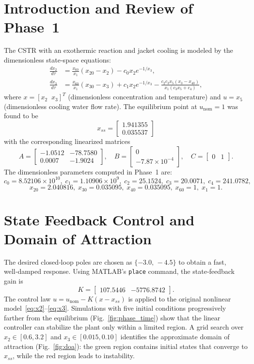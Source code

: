 \documentclass[12pt,a4paper]{article}
\begin{document}
\section{Introduction and Review of Phase~1}
The CSTR with an exothermic reaction and jacket cooling is modeled by the dimensionless state‑space equations:
\begin{align}
\frac{dx_2}{d\tau} &= \frac{x_{60}}{x_1}(x_{20}-x_2) - c_0 x_2 e^{-1/x_3}, \label{eq:x2}\\
\frac{dx_3}{d\tau} &= \frac{x_{60}}{x_1}(x_{30}-x_3) + c_1 x_2 e^{-1/x_3} - \frac{c_2 c_3 x_5 (x_3-x_{40})}{x_1(c_3 x_5 + c_4)}, \label{eq:x3}
\end{align}
where $x = [x_2\;\;x_3]^T$ (dimensionless concentration and temperature) and $u = x_5$ (dimensionless cooling water flow rate). The equilibrium point at $u_{\text{nom}}=1$ was found to be
\[
x_{ss} = \begin{bmatrix} 1.941355 \\ 0.035537 \end{bmatrix}
\]
with the corresponding linearized matrices
\[
A = \begin{bmatrix} -1.0512 & -78.7580 \\ 0.0007 & -1.9024 \end{bmatrix},\quad
B = \begin{bmatrix} 0 \\ -7.87\times10^{-4} \end{bmatrix},\quad
C = \begin{bmatrix} 0 & 1 \end{bmatrix}.
\]
The dimensionless parameters computed in Phase~1 are:
\[
c_0 = 8.52106\times10^{10},\; c_1 = 1.10906\times10^{9},\; c_2 = 25.1524,\; c_3 = 20.0071,\; c_4 = 241.0782,
\]
\[
x_{20}=2.040816,\; x_{30}=0.035095,\; x_{40}=0.035095,\; x_{60}=1,\; x_1=1.
\]

\section{State Feedback Control and Domain of Attraction}
The desired closed‑loop poles are chosen as $\{-3.0,\,-4.5\}$ to obtain a fast, well‑damped response. Using MATLAB’s \texttt{place} command, the state‑feedback gain is
\[
K = \begin{bmatrix} 107.5446 & -5776.8742 \end{bmatrix}.
\]
The control law $u = u_{\text{nom}} - K(x-x_{ss})$ is applied to the original nonlinear model~\eqref{eq:x2}--\eqref{eq:x3}. Simulations with five initial conditions progressively farther from the equilibrium (Fig.~\ref{fig:phase_time}) show that the linear controller can stabilize the plant only within a limited region. A grid search over $x_2\in[0.6,3.2]$ and $x_3\in[0.015,0.10]$ identifies the approximate domain of attraction (Fig.~\ref{fig:doa}): the green region contains initial states that converge to $x_{ss}$, while the red region leads to instability.
\end{document}
